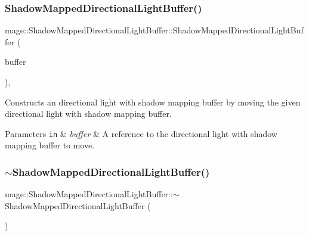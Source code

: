 \subsubsection{\texorpdfstring{Shadow\+Mapped\+Directional\+Light\+Buffer()}{ShadowMappedDirectionalLightBuffer()}\hspace{0.1cm}{\footnotesize\ttfamily [3/3]}}
{\footnotesize\ttfamily mage\+::\+Shadow\+Mapped\+Directional\+Light\+Buffer\+::\+Shadow\+Mapped\+Directional\+Light\+Buffer (\begin{DoxyParamCaption}\item[{\hyperlink{structmage_1_1_shadow_mapped_directional_light_buffer}{Shadow\+Mapped\+Directional\+Light\+Buffer} \&\&}]{buffer }\end{DoxyParamCaption})\hspace{0.3cm}{\ttfamily [default]}, {\ttfamily [noexcept]}}

Constructs an directional light with shadow mapping buffer by moving the given directional light with shadow mapping buffer.


\begin{DoxyParams}[1]{Parameters}
\mbox{\tt in}  & {\em buffer} & A reference to the directional light with shadow mapping buffer to move. \\
\hline
\end{DoxyParams}
\hypertarget{structmage_1_1_shadow_mapped_directional_light_buffer_ab91282042e06117f7df5a24762ac03c6}{}\label{structmage_1_1_shadow_mapped_directional_light_buffer_ab91282042e06117f7df5a24762ac03c6} 
\subsubsection{\texorpdfstring{$\sim$\+Shadow\+Mapped\+Directional\+Light\+Buffer()}{~ShadowMappedDirectionalLightBuffer()}}
{\footnotesize\ttfamily mage\+::\+Shadow\+Mapped\+Directional\+Light\+Buffer\+::$\sim$\+Shadow\+Mapped\+Directional\+Light\+Buffer (\begin{DoxyParamCaption}{ }\end{DoxyParamCaption})\hspace{0.3cm}{\ttfamily [default]}}

